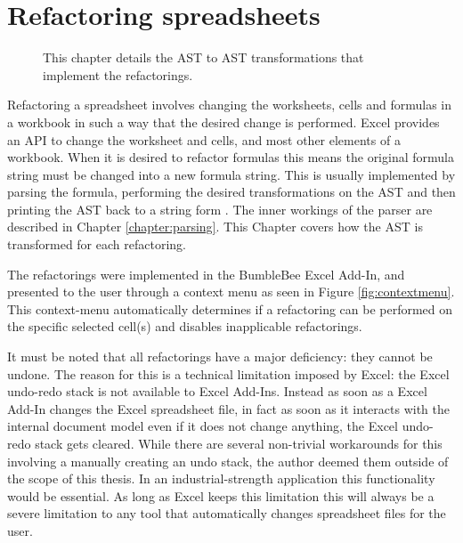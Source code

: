 
\chapter{Refactoring spreadsheets}
\label{chapter:implementingrefactorings}

\noindent
\begin{figure}[h!]
\hspace*{0.003\textwidth}

\caption{This chapter details the AST to AST transformations that implement the refactorings.}
\end{figure}

Refactoring a spreadsheet involves changing the worksheets, cells and formulas in a workbook in such a way that the desired change is performed.
Excel provides an API to change the worksheet and cells, and most other elements of a workbook.
When it is desired to refactor formulas this means the original formula string must be changed into a new formula string.
This is usually implemented by parsing the formula, performing the desired transformations on the AST and then printing the AST back to a string form \cite{fowler1999refactoring}.
The inner workings of the parser are described in Chapter \ref{chapter:parsing}.
This Chapter covers how the AST is transformed for each refactoring.

The refactorings were implemented in the BumbleBee Excel Add-In, and presented to the user through a context menu as seen in Figure \ref{fig:contextmenu}.
This context-menu automatically determines if a refactoring can be performed on the specific selected cell(s) and disables inapplicable refactorings.

It must be noted that all refactorings have a major deficiency: they cannot be undone.
The reason for this is a technical limitation imposed by Excel: the Excel undo-redo stack is not available to Excel Add-Ins.
Instead as soon as a Excel Add-In changes the Excel spreadsheet file, in fact as soon as it interacts with the internal document model even if it does not change anything, the Excel undo-redo stack gets cleared.
While there are several non-trivial workarounds for this involving a manually creating an undo stack, the author deemed them outside of the scope of this thesis.
In an industrial-strength application this functionality would be essential.
As long as Excel keeps this limitation this will always be a severe limitation to any tool that automatically changes spreadsheet files for the user.


